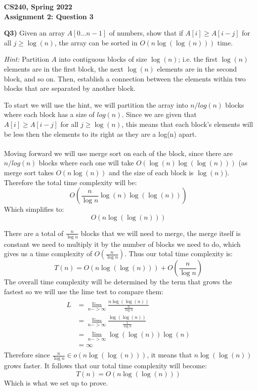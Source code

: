 \documentclass[12pt]{article}
\begin{document}
\begin{center}
{\Large\textbf{CS240, Spring 2022}}\\
\vspace{2mm}
{\Large\textbf{Assignment 2: Question 3}}\\
\vspace{3mm}
\end{center}
\[ \]
\textbf{Q3)} Given an array $A[0\ldots n-1]$ of numbers, show that if $A[i] \geq A[i-j]$ for all $j \geq \log(n)$, the array can be sorted in $O(n \log(\log(n)))$ time.

\smallskip
\noindent \textit{Hint:} Partition $A$ into contiguous blocks of size
$\log (n)$; i.e.  the first $\log (n)$ elements are in the first
block, the next $\log (n)$ elements are in the second block, and so
on. Then, establish a connection between the elements within two
blocks that are separated by another block.\\
\begin{adjustwidth}{0em}{0pt}

To start we will use the hint, we will partition the array into $n/log(n)$ blocks where each block has a size of $log(n)$. Since we are given that $A[i] \geq A[i-j]$ for all $j \geq \log(n)$, this means that each block's elements will be less then the elements to its right as they are a log(n) apart. \\ \\
Moving forward we will use merge sort on each of the block, since there are $n/log(n)$ blocks where each one will take $O(\log(n)\log(\log(n)))$ (as merge sort takes $O(n\log(n))$ and the size of each block is $\log(n)$). Therefore the total time complexity will be:
\[ O(\frac{n}{\log{n}}\log(n)\log(\log(n))) \]
Which simplifies to:
\[ O(n\log(\log(n))) \]

There are a total of $\frac{n}{\log{n}}$ blocks that we will need to merge, the merge itself is constant we need to multiply it by the number of blocks we need to do, which gives us a time complexity of $O(\frac{n}{\log{n}})$. Thus our total time complexity is:
\[ T(n) = O(n\log(\log(n))) + O(\frac{n}{\log{n}}) \]
The overall time complexity will be determined by the term that grows the fastest so we will use the lime test to compare them:
\begin{align*}
    \begin{aligned}
       L &= \lim_{n->\infty}\frac{n\log(\log(n))}{\frac{n}{\log{n}}}  \\
       &= \lim_{n->\infty}\frac{\log(\log(n))}{\frac{1}{\log{n}}} \\
       &= \lim_{n->\infty}\log(\log(n))\log(n) \\
       &= \infty 
    \end{aligned}
\end{align*}
Therefore since $\frac{n}{\log{n}} \in o(n\log(\log(n)))$, it means that $n\log(\log(n))$ grows faster. It follows that our total time complexity will become:
\[ T(n) = O(n\log(\log(n))) \]
Which is what we set up to prove.
\end{adjustwidth} 
\end{document}
